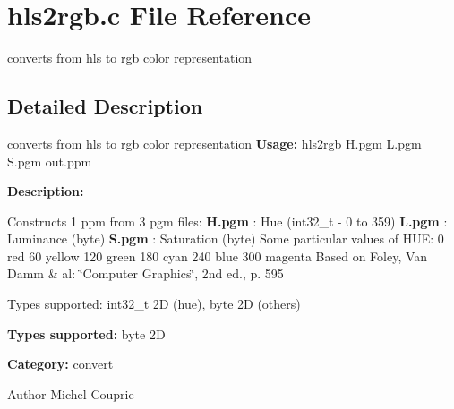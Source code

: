 \section{hls2rgb.c File Reference}
\label{hls2rgb_8c}


converts from hls to rgb color representation  




\subsection{Detailed Description}
converts from hls to rgb color representation {\bfseries Usage:} hls2rgb H.pgm L.pgm S.pgm out.ppm

{\bfseries Description:}

Constructs 1 ppm from 3 pgm files: {\bfseries H.pgm} : Hue (int32\_\-t -\/ 0 to 359) {\bfseries L.pgm} : Luminance (byte) {\bfseries S.pgm} : Saturation (byte) Some particular values of HUE: 0 red 60 yellow 120 green 180 cyan 240 blue 300 magenta Based on Foley, Van Damm \& al: \char`\"{}Computer Graphics\char`\"{}, 2nd ed., p. 595

Types supported: int32\_\-t 2D (hue), byte 2D (others)

{\bfseries Types supported:} byte 2D

{\bfseries Category:} convert

\begin{DoxyAuthor}{Author}
Michel Couprie 
\end{DoxyAuthor}
